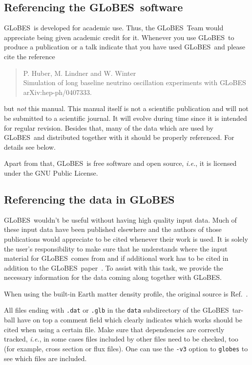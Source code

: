 \documentclass[a4paper,12pt,twoside]{book}
\newcommand{\glbxxx}{hep-ph/0407333}
\newcommand{\ie}{{\it i.e.}}
\newcommand{\Ref}{Ref.}
\newcommand{\GLOBES}{{\sf GLoBES}}
\begin{document}
\subsection*{Referencing the \GLOBES\ software}

\GLOBES\ is developed for academic use. Thus, the \GLOBES\ Team would
appreciate being given academic credit for it. Whenever you use \GLOBES\
to produce a publication or a talk indicate that you have used \GLOBES\ and
please cite the reference~\cite{globes_paper}
\begin{quote}
P. Huber, M. Lindner and W. Winter\\
Simulation of long baseline neutrino oscillation experiments with \GLOBES\\
arXiv:\glbxxx.  
\end{quote}
but \emph{not} this manual. This manual itself is not a scientific 
publication and will not be submitted to a scientific journal. 
It will evolve during time since it is intended for 
regular revision. Besides that, many of the data which are used by \GLOBES\ 
and distributed together with it should be properly referenced. 
For details see below.

Apart from that, \GLOBES\ is free software and open source, \ie, it is 
licensed under the GNU Public License.

\subsection*{Referencing the data in \GLOBES}
\label{ref_data}

\index{norm}{Referencing!data in \GLOBES}
\GLOBES\ wouldn't be useful without having high quality input data.
Much of these input data have been published elsewhere and the authors
of those publications would appreciate to be cited whenever their work
is used. It is solely the user's responsibility 
to make sure that he understands where the input material for \GLOBES\ comes
from and if additional work has to be cited in addition to the 
\GLOBES\ paper~\cite{globes_paper}. To assist with this task, we provide  the necessary information for the data coming along together with \GLOBES.

When using the built-in Earth matter density profile, the 
original source is \Ref~\cite{Stacey}.

All files ending with \verb+.dat+ or \verb+.glb+ 
in the \verb+data+ subdirectory of the \GLOBES\ tar-ball have on top a comment field which clearly indicates which works should be
cited when using a certain file. Make sure that dependencies are correctly
tracked, \ie , in some cases files included by other files need to be 
checked, too (for example, cross section or flux files). One can use 
the \verb+-v3+ option to \verb+globes+ to see which files
are included.
\end{document}
